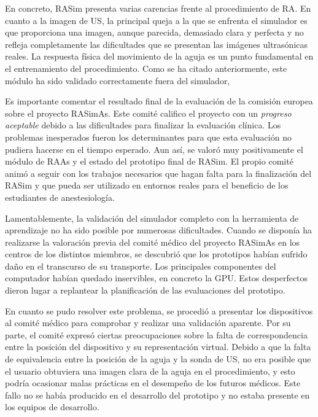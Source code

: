En concreto, \ac{RASim} presenta varias carencias frente al procedimiento de \ac{RA}. 
En cuanto a la imagen de \ac{US}, la principal queja a la que se enfrenta el simulador es que proporciona una imagen, aunque parecida, demasiado clara y perfecta y no refleja completamente las dificultades que se presentan las imágenes ultrasónicas reales.
La respuesta física del movimiento de la aguja es un punto fundamental en el entrenamiento del procedimiento. Como se ha citado anteriormente, este módulo ha sido validado correctamente fuera del simulador, 

Es importante comentar el resultado final de la evaluación de la comisión europea sobre el proyecto \ac{RASimAs}. Este comité califico el proyecto con un \emph{progreso aceptable} debido a las dificultades para finalizar la evaluación clínica. Los problemas inesperados fueron los determinantes para que esta evaluación no pudiera hacerse en el tiempo esperado. Aun así, se valoró muy positivamente el módulo de \ac{RAAs} y el estado del prototipo final de \ac{RASim}. El propio comité animó a seguir con los trabajos necesarios que hagan falta para la finalización del \ac{RASim} y que pueda ser utilizado en entornos reales para el beneficio de los estudiantes de anestesiología.

Lamentablemente, la validación del simulador completo con la herramienta de aprendizaje no ha sido posible por numerosas dificultades.
Cuando se disponía ha realizarse la valoración previa del comité médico del proyecto \ac{RASimAs} en los centros de los distintos miembros, se descubrió que los prototipos habían sufrido daño en el transcurso de su transporte. Los principales componentes del computador habían quedado inservibles, en concreto la \ac{GPU}. Estos desperfectos dieron lugar a replantear la planificación de las evaluaciones del prototipo.

En cuanto se pudo resolver este problema, se procedió a presentar los dispositivos al comité médico para comprobar y realizar una validación aparente. Por su parte, el comité expresó ciertas preocupaciones sobre la falta de correspondencia entre la posición del dispositivo y su representación virtual. Debido a que la falta de equivalencia entre la posición de la aguja y la sonda de \ac{US}, no era posible que el usuario obtuviera una imagen clara de la aguja en el procedimiento, y esto podría ocasionar malas prácticas en el desempeño de los futuros médicos. Este fallo no se había producido en el desarrollo del prototipo y no estaba presente en los equipos de desarrollo. 

